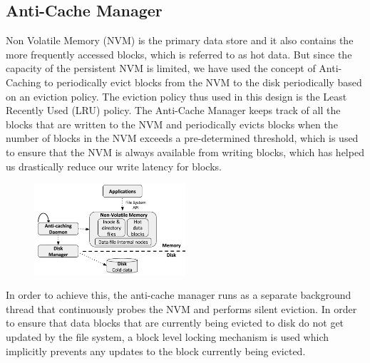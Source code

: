 \subsection{Anti-Cache Manager}
Non Volatile Memory (NVM) is the primary data store and it also contains the more frequently accessed blocks, which is referred to as hot data. But since the capacity of the persistent NVM is limited, we have used the concept of Anti-Caching to periodically evict blocks from the NVM to the disk periodically based on an eviction policy. The eviction policy thus used in this design is the Least Recently Used (LRU) policy. The Anti-Cache Manager keeps track of all the blocks that are written to the NVM and periodically evicts blocks when the number of blocks in the NVM exceeds a pre-determined threshold, which is used to ensure that the NVM is always available from writing blocks, which has helped us drastically reduce our write latency for blocks.

\begin{figure}
\centering
\vspace{-0.2in}
\includegraphics[width=0.5\textwidth]{figs/bpfs.pdf}
\vspace{-0.2in}
\end{figure}

In order to achieve this, the anti-cache manager runs as a separate background thread that continuously probes the NVM and performs silent eviction. In order to ensure that data blocks that are currently being evicted to disk do not get updated by the file system, a block level locking mechanism is used which implicitly prevents any updates to the block currently being evicted.


